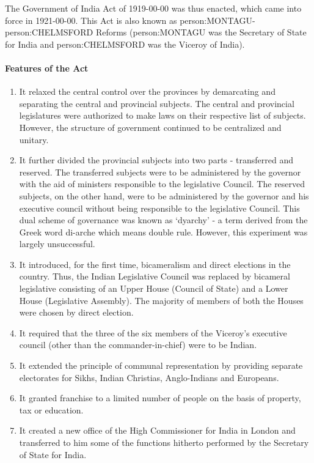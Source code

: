 The Government of India Act of 1919-00-00 was thus enacted, which came into force in 1921-00-00. This Act is also known as \gls{person:MONTAGU}-\gls{person:CHELMSFORD} Reforms (\gls{person:MONTAGU} was the Secretary of State for India and \gls{person:CHELMSFORD} was the Viceroy of India).

\paragraph{Features of the Act}
\begin{enumerate}
  \item It relaxed the central control over the provinces by demarcating and separating the central and provincial subjects. The central and provincial legislatures were authorized to make laws on their respective list of subjects. However, the structure of government continued to be
  centralized and unitary.
  \item It further divided the provincial subjects into two parts - transferred and reserved. The transferred subjects were to be administered by the governor with the aid of ministers responsible to the legislative Council. The reserved subjects, on the other hand, were to be administered by the governor and his executive council without being responsible to the legislative Council. This dual scheme of governance was known as
   `dyarchy' - a term derived from the Greek word di-arche which means double rule. However, this experiment was largely unsuccessful.
  \item It introduced, for the first time, bicameralism and direct elections in the country. Thus, the Indian Legislative Council was replaced by bicameral legislative consisting of an Upper House (Council of State) and a Lower House (Legislative Assembly). The majority of members of both the Houses were chosen by direct election.
  \item It required that the three of the six members of the Viceroy's executive council (other than the commander-in-chief) were to be Indian.
  \item It extended the principle of communal representation by providing separate electorates for Sikhs, Indian Christias, Anglo-Indians and Europeans.
  \item It granted franchise to a limited number of people on the basis of property, tax or education.
  \item It created a new office of the High Commissioner for India in London and transferred to him some of the functions hitherto performed by the Secretary of State for India.

\end{enumerate}
